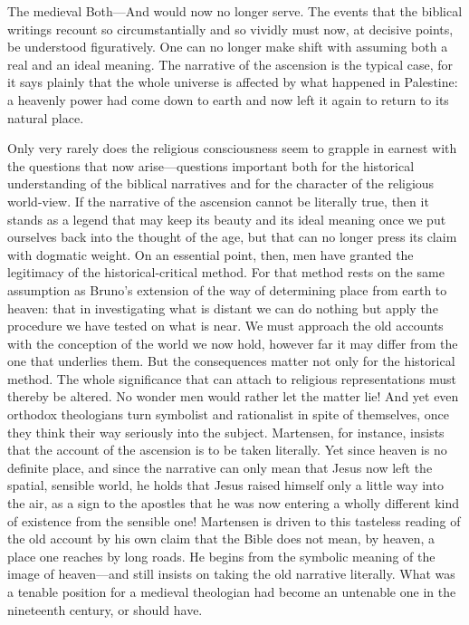 \documentclass[12pt,a4paper]{article}
\newcommand{\opage}[1]{\marginnote{\footnotesize\textit{[#1]}}}
\begin{document}
The medieval Both---And would now no longer serve. The events that the biblical
writings recount so circumstantially and so vividly must now, at decisive points,
be understood figuratively. One can no longer make shift with assuming both a real
and an ideal meaning. The narrative of the ascension is the typical case, for it
says plainly that the whole universe is affected by what happened in Palestine: \opage{9}a
heavenly power had come down to earth and now left it again to return to its
natural place.

Only very rarely does the religious consciousness seem to grapple in earnest with
the questions that now arise---questions important both for the historical
understanding of the biblical narratives and for the character of the religious
world-view. If the narrative of the ascension cannot be literally true, then it
stands as a legend that may keep its beauty and its ideal meaning once we put
ourselves back into the thought of the age, but that can no longer press its claim
with dogmatic weight. On an essential point, then, men have granted the legitimacy
of the historical-critical method. For that method rests on the same assumption as
Bruno's extension of the way of determining place from earth to heaven: that in
investigating what is distant we can do nothing but apply the procedure we have
tested on what is near. We must approach the old accounts with the conception of
the world we now hold, however far it may differ from the one that underlies them.
But the consequences matter not only for the historical method. The whole
significance that can attach to religious representations must thereby be altered.
No wonder men would rather let the matter lie! And yet even orthodox theologians
turn symbolist and rationalist in spite of themselves, once they think their way
seriously into the subject. Martensen, for instance, insists that the account of
the ascension is to be taken literally. Yet since heaven is no definite place, and
since the narrative can only mean that Jesus now left the spatial, sensible world,
he holds that Jesus raised himself only a little way into the air, as a sign to
the apostles that he was now entering a wholly different kind of \opage{10}existence from the
sensible one! Martensen is driven to this tasteless reading of the old account by
his own claim that the Bible does not mean, by heaven, a place one reaches by long
roads. He begins from the symbolic meaning of the image of heaven---and still
insists on taking the old narrative literally. What was a tenable position for a
medieval theologian had become an untenable one in the nineteenth century, or
should have.
\end{document}
